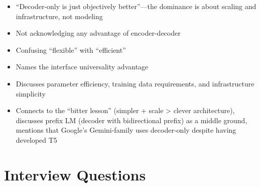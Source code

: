 \begin{interviewq}
\redflags
\begin{itemize}
    \item ``Decoder-only is just objectively better''---the dominance is about scaling and infrastructure, not modeling
    \item Not acknowledging any advantage of encoder-decoder
    \item Confusing ``flexible'' with ``efficient''
\end{itemize}


\goodgreat
\begin{itemize}
    \item {} Names the interface universality advantage
    \item {} Discusses parameter efficiency, training data requirements, and infrastructure simplicity
    \item {} Connects to the ``bitter lesson'' (simpler + scale > clever architecture), discusses prefix LM (decoder with bidirectional prefix) as a middle ground, mentions that Google's Gemini-family uses decoder-only despite having developed T5
\end{itemize}

\end{interviewq}

\section{Interview Questions}
\label{sec:nlp_interview}

